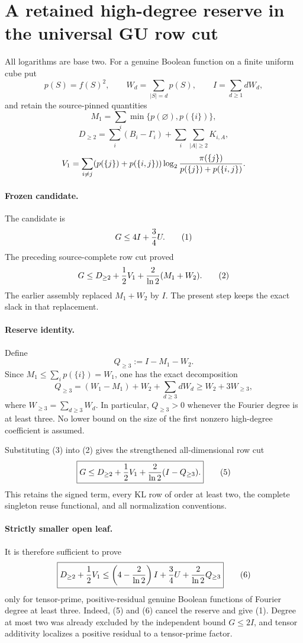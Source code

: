 \section*{A retained high-degree reserve in the universal GU row cut}

All logarithms are base two.  For a genuine Boolean function on a finite
uniform cube put
\[
 p(S)=\widehat f(S)^2,\qquad
 W_d=\sum_{|S|=d}p(S),\qquad
 I=\sum_{d\ge1}dW_d,
\]
and retain the source-pinned quantities
\[
 M_1=\sum_i\min\{p(\varnothing),p(\{i\})\},
\]
\[
 D_{\ge2}=\sum_i(B_i-\Gamma_i)
 +\sum_i\sum_{|A|\ge2}K_{i,A},
\]
\[
 V_1=\sum_{i\ne j}(p(\{j\})+p(\{i,j\}))
 \log_2{\pi(\{j\})\over p(\{j\})+p(\{i,j\})}.
\]

\paragraph{Frozen candidate.}
The candidate is
\[
 G\le4I+{3\over4}U.                                      \tag{1}
\]
The preceding source-complete row cut proved
\[
 G\le D_{\ge2}+{1\over2}V_1+{2\over\ln2}(M_1+W_2).       \tag{2}
\]
The earlier assembly replaced $M_1+W_2$ by $I$.  The present step keeps
the exact slack in that replacement.

\paragraph{Reserve identity.}
Define
\[
 Q_{\ge3}:=I-M_1-W_2.                                    \tag{3}
\]
Since $M_1\le\sum_i p(\{i\})=W_1$, one has the exact decomposition
\[
 \boxed{
 Q_{\ge3}=(W_1-M_1)+W_2+\sum_{d\ge3}dW_d
 \ge W_2+3W_{\ge3},}                                    \tag{4}
\]
where $W_{\ge3}=\sum_{d\ge3}W_d$.  In particular,
$Q_{\ge3}>0$ whenever the Fourier degree is at least three.  No lower
bound on the size of the first nonzero high-degree coefficient is assumed.

Substituting (3) into (2) gives the strengthened all-dimensional row cut
\[
 \boxed{
 G\le D_{\ge2}+{1\over2}V_1
 +{2\over\ln2}(I-Q_{\ge3}).}                           \tag{5}
\]
This retains the signed term, every KL row of order at least two, the
complete singleton reuse functional, and all normalization conventions.

\paragraph{Strictly smaller open leaf.}
It is therefore sufficient to prove
\[
 \boxed{
 D_{\ge2}+{1\over2}V_1
 \le\left(4-{2\over\ln2}\right)I+{3\over4}U
       +{2\over\ln2}Q_{\ge3}}                          \tag{6}
\]
only for tensor-prime, positive-residual genuine Boolean functions of
Fourier degree at least three.  Indeed, (5) and (6) cancel the reserve
and give (1).  Degree at most two was already excluded by the independent
bound $G\le2I$, and tensor additivity localizes a positive residual to a
tensor-prime factor.

